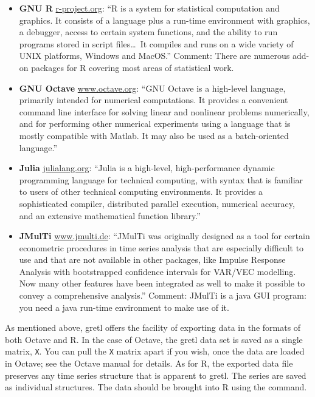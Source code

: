 \begin{itemize}

\item \textbf{GNU R} \href{http://www.r-project.org/}{r-project.org}:
  ``R is a system for statistical computation and graphics. It
  consists of a language plus a run-time environment with graphics, a
  debugger, access to certain system functions, and the ability to run
  programs stored in script files\dots\ It compiles and runs on a wide
  variety of UNIX platforms, Windows and MacOS.''  Comment: There are
  numerous add-on packages for R covering most areas of statistical
  work.

\item \textbf{GNU Octave}
  \href{http://www.octave.org/}{www.octave.org}:
  ``GNU Octave is a high-level language, primarily intended for
  numerical computations. It provides a convenient command line
  interface for solving linear and nonlinear problems numerically, and
  for performing other numerical experiments using a language that is
  mostly compatible with Matlab. It may also be used as a
  batch-oriented language.''

\item \textbf{Julia} \href{http://julialang.org/}{julialang.org}:
  ``Julia is a high-level, high-performance dynamic programming
  language for technical computing, with syntax that is familiar to
  users of other technical computing environments. It provides a
  sophisticated compiler, distributed parallel execution, numerical
  accuracy, and an extensive mathematical function library.''

\item \textbf{JMulTi} \href{http://www.jmulti.de/}{www.jmulti.de}:
  ``JMulTi was originally designed as a tool for certain econometric
  procedures in time series analysis that are especially difficult to
  use and that are not available in other packages, like Impulse
  Response Analysis with bootstrapped confidence intervals for VAR/VEC
  modelling. Now many other features have been integrated as well to
  make it possible to convey a comprehensive analysis.''  Comment:
  JMulTi is a java GUI program: you need a java run-time environment to
  make use of it.

\end{itemize}

As mentioned above, gretl offers the facility of exporting
data in the formats of both Octave and R.  In the case of Octave, the
gretl data set is saved as a single matrix, \verb+X+. You can
pull the \verb+X+ matrix apart if you wish, once the data are loaded
in Octave; see the Octave manual for details.  As for R, the exported
data file preserves any time series structure that is apparent to
gretl.  The series are saved as individual structures. The data
should be brought into R using the  command.
  
